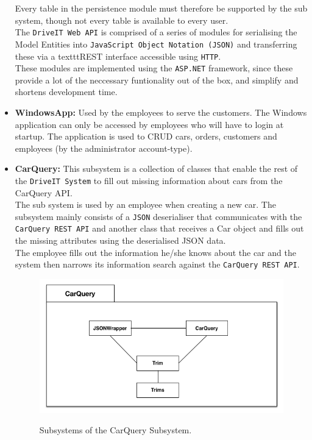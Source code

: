 \begin{itemize}
	Every table in the persistence module must therefore be supported by the sub system, though not every table is available to every user.\\
	The \texttt{DriveIT Web API} is comprised of a series of modules for serialising the Model Entities into \texttt{JavaScript Object Notation (JSON)} and transferring these via a texttt{REST} interface accessible using \texttt{HTTP}. \\
	These modules are implemented using the \texttt{ASP.NET} framework, since these provide a lot of the neccessary funtionality out of the box, and simplify and shortens development time.
	\item \textbf{WindowsApp:} Used by the employees to serve the customers. The Windows application can only be accessed by employees who will have to login at startup. The application is used to CRUD cars, orders, customers and employees (by the administrator account-type).
	\item \textbf{CarQuery:} This subsystem is a collection of classes that enable the rest of the \texttt{DriveIT System} to fill out missing information about cars from the CarQuery API.\\
	The sub system is used by an employee when creating a new car. The subsystem mainly consists of a \texttt{JSON} deserialiser that communicates with the \texttt{CarQuery REST API} and another class that receives a Car object and fills out the missing attributes using the deserialised JSON data. \\
	The employee fills out the information he/she knows about the car and the system then narrows its information search against the \texttt{CarQuery REST API}.
	\begin{figure}[H]
		\centering
		\includegraphics[scale=0.30]{Figures/CarQuerySubsystemDecomposition}\\
		\caption{Subsystems of the CarQuery Subsystem.}
	\end{figure}
\end{itemize}